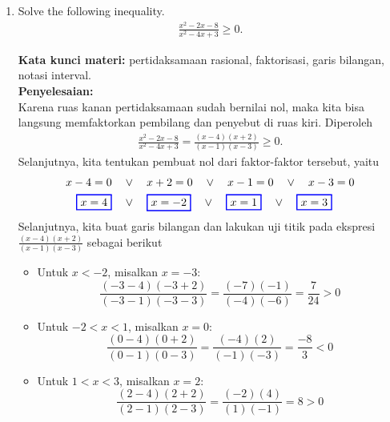\documentclass[10pt,openany,a4paper]{article}
\theoremstyle{definition}
\theoremstyle{definition}
\theoremstyle{plain}
\newenvironment{jawab}[2][tes]{%
\par\noindent\textbf{Kata kunci materi:} #1.\\
\textbf{Penyelesaian:} #2%
}{}
\begin{document}
\begin{enumerate}
    \item Solve the following inequality.
    \begin{align*}
        \frac{x^2-2x-8}{x^2-4x+3}\geq 0.
    \end{align*}
    \begin{jawab}[pertidaksamaan rasional, faktorisasi, garis bilangan, notasi interval]{~\\
    Karena ruas kanan pertidaksamaan sudah bernilai nol, maka kita bisa langsung memfaktorkan pembilang dan penyebut di ruas kiri. Diperoleh
    \begin{align*}
        \frac{x^2-2x-8}{x^2-4x+3} = \frac{(x-4)(x+2)}{(x-1)(x-3)} \geq 0.
    \end{align*}
    Selanjutnya, kita tentukan pembuat nol dari faktor-faktor tersebut, yaitu
    \begin{align*}
        x-4 = 0 \quad &\vee\quad x+2 = 0 \quad \vee\quad x-1 = 0 \quad \vee\quad x-3 = 0\\
        \colorlet{oldcolor}{.}
        \color{blue}
        \setlength{\fboxrule}{1pt} \boxed{\color{oldcolor}x=4}\color{oldcolor} \quad &\vee\quad \colorlet{oldcolor}{.}
        \color{blue}
        \setlength{\fboxrule}{1pt} \boxed{\color{oldcolor}x=-2}\color{oldcolor} \quad \vee\quad \colorlet{oldcolor}{.}
        \color{blue}
        \setlength{\fboxrule}{1pt} \boxed{\color{oldcolor}x=1}\color{oldcolor} \quad \vee\quad \colorlet{oldcolor}{.}
        \color{blue}
        \setlength{\fboxrule}{1pt} \boxed{\color{oldcolor}x=3}\color{oldcolor}
    \end{align*}
    Selanjutnya, kita buat garis bilangan dan lakukan uji titik pada ekspresi \(\frac{(x-4)(x+2)}{(x-1)(x-3)}\) sebagai berikut
    \begin{itemize}
        \item Untuk \(x < -2\), misalkan \(x = -3\):
        \[
        \frac{(-3-4)(-3+2)}{(-3-1)(-3-3)} = \frac{(-7)(-1)}{(-4)(-6)} = \frac{7}{24} > 0
        \]
        \item Untuk \(-2 < x < 1\), misalkan \(x = 0\):
        \[
        \frac{(0-4)(0+2)}{(0-1)(0-3)} = \frac{(-4)(2)}{(-1)(-3)} = \frac{-8}{3} < 0
        \]
        \item Untuk \(1 < x < 3\), misalkan \(x = 2\):
        \[
        \frac{(2-4)(2+2)}{(2-1)(2-3)} = \frac{(-2)(4)}{(1)(-1)} = 8 > 0
\]
\end{itemize}}
\end{jawab}
\end{enumerate}
\end{document}
